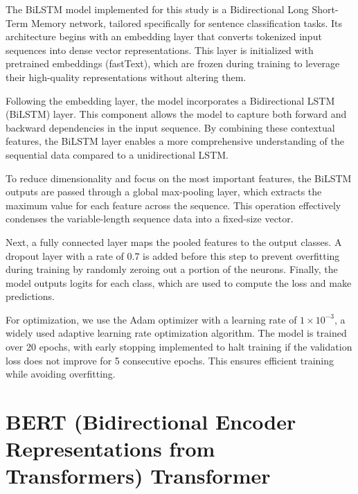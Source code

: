 The BiLSTM model implemented for this study is a Bidirectional Long Short-Term Memory network, tailored specifically for sentence classification tasks. Its architecture begins with an embedding layer that converts tokenized input sequences into dense vector representations. This layer is initialized with pretrained embeddings (fastText), which are frozen during training to leverage their high-quality representations without altering them.

\vspace{3mm} 

Following the embedding layer, the model incorporates a Bidirectional LSTM (BiLSTM) layer. This component allows the model to capture both forward and backward dependencies in the input sequence. By combining these contextual features, the BiLSTM layer enables a more comprehensive understanding of the sequential data compared to a unidirectional LSTM.

\vspace{3mm} 

To reduce dimensionality and focus on the most important features, the BiLSTM outputs are passed through a global max-pooling layer, which extracts the maximum value for each feature across the sequence. This operation effectively condenses the variable-length sequence data into a fixed-size vector.

\vspace{3mm} 

Next, a fully connected layer maps the pooled features to the output classes. A dropout layer with a rate of 0.7 is added before this step to prevent overfitting during training by randomly zeroing out a portion of the neurons. Finally, the model outputs logits for each class, which are used to compute the loss and make predictions.

\vspace{3mm} 

For optimization, we use the Adam optimizer with a learning rate of \(1 \times 10^{-3}\), a widely used adaptive learning rate optimization algorithm. The model is trained over 20 epochs, with early stopping implemented to halt training if the validation loss does not improve for 5 consecutive epochs. This ensures efficient training while avoiding overfitting.

\vspace{3mm} 

\section{BERT (Bidirectional Encoder Representations from Transformers) Transformer}

